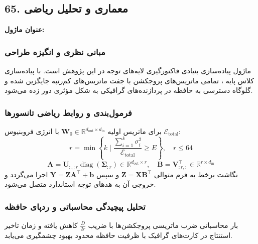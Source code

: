 \subsection*{65. معماری و تحلیل ریاضی }
\textbf{عنوان ماژول:} 

\subsubsection*{مبانی نظری و انگیزه طراحی}
ماژول  پیاده‌سازی بنیادی فاکتورگیری لایه‌های توجه در این پژوهش است. با پیاده‌سازی کلاس پایه ، تمامی ماتریس‌های پروجکشن با جفت ماتریس‌های کم‌رتبه جایگزین شده و گلوگاه دسترسی به حافظه در پردازنده‌های گرافیکی به شکل مؤثری دور زده می‌شود.

\subsubsection*{فرمول‌بندی و روابط ریاضی تانسورها}
برای ماتریس اولیه $\mathbf{W}_0 \in \mathbb{R}^{d_{\text{out}} \times d_{\text{in}}}$ با انرژی فروبنیوس $\mathcal{E}_{\text{total}}$:
\begin{equation}
r = \min \left\{ k \;\Big|\; \frac{\sum_{i=1}^k \sigma_i^2}{\mathcal{E}_{\text{total}}} \ge E \right\}, \quad r \le 64
\end{equation}
\begin{equation}
\mathbf{A} = \mathbf{U}_{:, :r} \operatorname{diag}(\mathbf{\Sigma}_{:r}) \in \mathbb{R}^{d_{\text{out}} \times r}, \quad \mathbf{B} = \mathbf{V}_{:r, :}^\top \in \mathbb{R}^{r \times d_{\text{in}}}
\end{equation}
نگاشت برخط به فرم متوالی $\mathbf{Z} = \mathbf{X} \mathbf{B}^\top$ و سپس $\mathbf{Y} = \mathbf{Z} \mathbf{A}^\top + \mathbf{b}$ اجرا می‌گردد و خروجی آن به هدهای توجه استاندارد متصل می‌شود.

\subsubsection*{تحلیل پیچیدگی محاسباتی و ردپای حافظه}
بار محاسباتی ضرب ماتریسی پروجکشن‌ها با ضریب $\frac{D}{2r}$ کاهش یافته و زمان تاخیر استنتاج در کارت‌های گرافیک با ظرفیت حافظه محدود بهبود چشمگیری می‌یابد.


